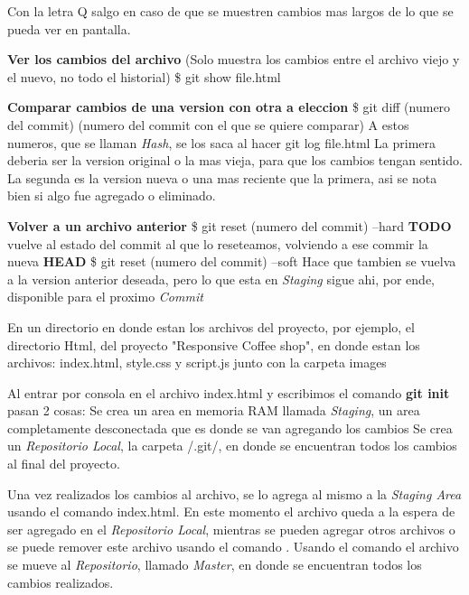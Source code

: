 \documentclass[]{article} %
\begin{document}
\begin{center}
	Con la letra Q salgo en caso de que se muestren cambios mas largos de lo que se pueda ver en pantalla.

	\textbf{Ver los cambios del archivo}
	(Solo muestra los cambios entre el archivo viejo y el nuevo, no todo el historial)
	\$ git show file.html

	\textbf{Comparar cambios de una version con otra a eleccion}
	\$ git diff (numero del commit) (numero del commit con el que se quiere comparar)
	A estos numeros, que se llaman \textit{Hash}, se los saca al hacer git log file.html
	La primera deberia ser la version original o la mas vieja, para que los cambios tengan sentido.
	La segunda es la version nueva o una mas reciente que la primera, asi se nota bien si algo fue agregado o eliminado.


	\textbf{Volver a un archivo anterior}
	\$ git reset (numero del commit) --hard \textbf{TODO} vuelve al estado del commit al que lo reseteamos, volviendo a ese commir la nueva \textbf{HEAD}
	\$ git reset (numero del commit) --soft Hace que tambien se vuelva a la version anterior deseada, pero lo que esta en \textit{Staging} sigue ahi, por ende, disponible para el proximo \textit{Commit}




\end{center}



En un directorio en donde estan los archivos del proyecto, por ejemplo, el directorio Html, del proyecto "Responsive Coffee shop", en donde estan los archivos: index.html, style.css y script.js junto con la carpeta images

Al entrar por consola en el archivo index.html y escribimos el comando \textbf{git init} pasan 2 cosas:
Se crea un area en memoria RAM llamada \textit{Staging}, un area completamente desconectada que es donde se van agregando los cambios
Se crea un \textit{Repositorio Local}, la carpeta /.git/, en donde se encuentran todos los cambios al final del proyecto.

Una vez realizados los cambios al archivo, se lo agrega al mismo a la \textit{Staging Area} usando el comando  index.html. En este momento el archivo queda a la espera de ser agregado en el \textit{Repositorio Local}, mientras se pueden agregar otros archivos o se puede remover este archivo usando el comando .
Usando el comando  el archivo se mueve al \textit{Repositorio}, llamado \textit{Master}, en donde se encuentran todos los cambios realizados.
\end{document}
